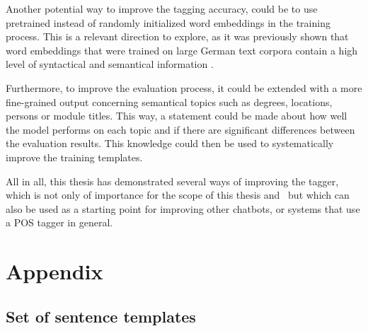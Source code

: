 Another potential way to improve the tagging accuracy, could be to use pretrained instead of randomly initialized word embeddings in the training process. This is a relevant direction to explore, as it was previously shown that word embeddings that were trained on large German text corpora contain a high level of syntactical and semantical information \cite{mueller2015}.

Furthermore, to improve the evaluation process, it could be extended with a more fine-grained output concerning semantical topics such as degrees, locations, persons or module titles. This way, a statement could be made about how well the model performs on each topic and if there are significant differences between the evaluation results. This knowledge could then be used to systematically improve the training templates.

All in all, this thesis has demonstrated several ways of improving the tagger, which is not only of importance for the scope of this thesis and \Alex\ but which can also be used as a starting point for improving other chatbots, or systems that use a POS tagger in general.




\appendix
\chapter{Appendix}\label{c.appendix}

\section{Set of sentence templates}\label{c.appendix.sentencetemplates}


\newpage

